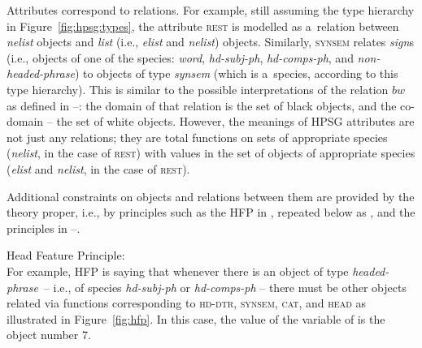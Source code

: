 \documentclass[output=paper,hidelinks]{langscibook}
\begin{document}
Attributes correspond to relations.  For example, still assuming the type hierarchy in Figure~\ref{fig:hpsg:types}, the attribute \textsc{rest} is modelled as a~relation between \textit{nelist} objects and \textit{list} (i.e., \textit{elist} and \textit{nelist}) objects.  Similarly, \textsc{synsem} relates \textit{sign}s (i.e., objects of one of the species: \textit{word}, \textit{hd-subj-ph}, \textit{hd-comps-ph}, and \textit{non-headed-phrase}) to objects of type \textit{synsem} (which is a~species, according to this type hierarchy).  This is similar to the possible interpretations of the relation $\mathit{bw}$ as defined in --: the domain of that relation is the set of black objects, and the co-domain -- the set of white objects.  However, the meanings of HPSG attributes are not just any relations; they are total functions on sets of appropriate species (\textit{nelist}, in the case of \textsc{rest}) with values in the set of objects of appropriate species (\textit{elist} and \textit{nelist}, in the case of \textsc{rest}).  

Additional constraints on objects and relations between them are provided by the theory proper, i.e., by principles such as the HFP in , repeated below as , and the principles in --.


\ea\label{hfp:again} Head Feature Principle: \smallskip\\
\z
For example, HFP is saying that whenever there is an object of type \textit{headed-phrase}~-- i.e., of species \textit{hd-subj-ph} or \textit{hd-comps-ph} -- there must be other objects related via functions corresponding to \textsc{hd-dtr}, \textsc{synsem}, \textsc{cat}, and \textsc{head} as illustrated in Figure~\ref{fig:hfp}.  In this case, the value of the variable \avm{\1} of  is the object number 7.
\end{document}
